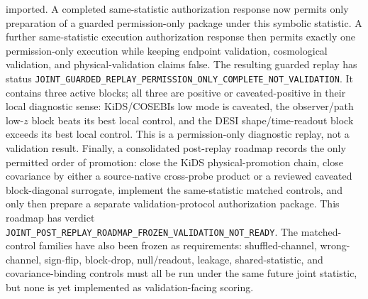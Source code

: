 imported.
A completed same-statistic authorization response now permits only preparation
of a guarded permission-only package under this symbolic statistic.  A further
same-statistic execution authorization response then permits exactly one
permission-only execution while keeping endpoint validation, cosmological
validation, and physical-validation claims false.  The resulting guarded replay
has status
\texttt{JOINT\_GUARDED\_REPLAY\_PERMISSION\_ONLY\_COMPLETE\_NOT\_VALIDATION}.
It contains three active blocks; all three are positive or caveated-positive in
their local diagnostic sense: KiDS/COSEBIs low mode is caveated, the
observer/path low-\(z\) block beats its best local control, and the DESI
shape/time-readout block exceeds its best local control.  This is a
permission-only diagnostic replay, not a validation result.
Finally, a consolidated post-replay roadmap records the only permitted order of
promotion: close the KiDS physical-promotion chain, close covariance by either
a source-native cross-probe product or a reviewed caveated block-diagonal
surrogate, implement the same-statistic matched controls, and only then prepare
a separate validation-protocol authorization package.  This roadmap has verdict
\texttt{JOINT\_POST\_REPLAY\_ROADMAP\_FROZEN\_VALIDATION\_NOT\_READY}.
The
matched-control families have also been frozen as requirements: shuffled-channel,
wrong-channel, sign-flip, block-drop, null/readout, leakage, shared-statistic,
and covariance-binding controls must all be run under the same future joint
statistic, but none is yet implemented as validation-facing scoring.

